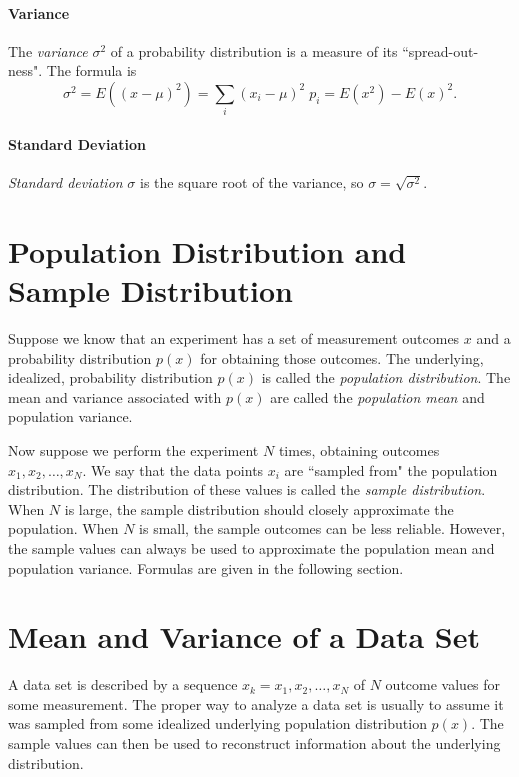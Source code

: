 \documentclass[11pt]{article}
\begin{document}
\paragraph*{Variance}
The \textit{variance} $\sigma^2$ of a probability distribution is a measure of its ``spread-out-ness". 
The formula is
\begin{equation*}
	\sigma^2 = E((x-\mu)^2) = \sum_i (x_i-\mu)^2 \; p_i 
	= E(x^2) - E(x)^2 .
\end{equation*}


\paragraph*{Standard Deviation}
\textit{Standard deviation} $\sigma$ is the square root of the variance, so $\sigma = \sqrt{\sigma^2}$.


\section*{Population Distribution and Sample Distribution}
Suppose we know that an experiment has a set of measurement outcomes $x$ and a probability distribution $p(x)$ for obtaining those outcomes. The underlying, idealized, probability distribution $p(x)$ is called the \textit{population distribution}. The mean and variance associated with $p(x)$ are called the \textit{population mean} and population variance.

Now suppose we perform the experiment $N$ times, obtaining outcomes $x_1, x_2, \ldots, x_N$. We say that the data points $x_i$ are ``sampled from" the population distribution. The distribution of these values is called the \textit{sample distribution}. When $N$ is large, the sample distribution should closely approximate the population. When $N$ is small, the sample outcomes can be less reliable. However, the sample values can always be used to approximate the population mean and population variance. Formulas are given in the following section.

\clearpage


\section*{Mean and Variance of a Data Set}
A data set is described by a sequence $x_k = x_1, x_2, \ldots, x_N$ of $N$ outcome values for some measurement. The proper way to analyze a data set is usually to assume it was sampled from some idealized underlying population distribution $p(x)$. The sample values can then be used to reconstruct information about the underlying distribution. 
\end{document}
